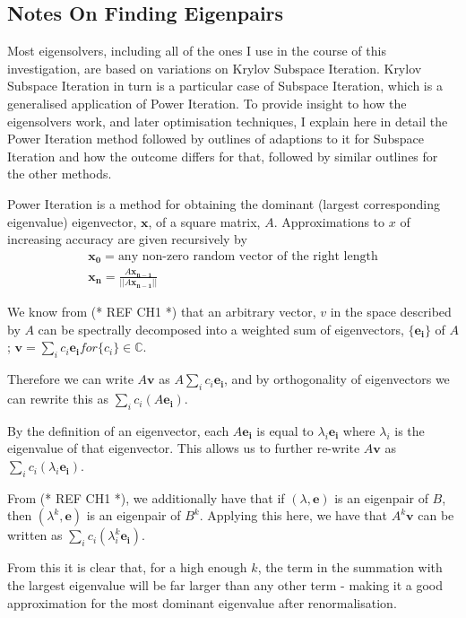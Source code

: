 \subsection{Notes On Finding Eigenpairs}
Most eigensolvers, including all of the ones I use in the course of this investigation, are based on variations on Krylov Subspace Iteration. Krylov Subspace Iteration in turn is a particular case of Subspace Iteration, which is a generalised application of Power Iteration. To provide insight to how the eigensolvers work, and later optimisation techniques, I explain here in detail the Power Iteration method followed by outlines of adaptions to it for Subspace Iteration and how the outcome differs for that, followed by similar outlines for the other methods. 


Power Iteration is a method for obtaining the dominant (largest corresponding eigenvalue) eigenvector, $\mathbf{x}$, of a square matrix, $A$. Approximations to $x$ of increasing accuracy are given recursively by
\begin{align*}
	\mathbf{x_0} = \text{any non-zero random vector of the right length}\\
	\mathbf{x_{n}} = \frac{A\mathbf{x_{n-1}}}{||A\mathbf{x_{n-1}}||}
\end{align*}

We know from (* REF CH1 *) that an arbitrary vector, $v$ in the space described by $A$ can be spectrally decomposed into a weighted sum of eigenvectors, $\{\mathbf{e_{i}}\}$ of $A$; $\mathbf{v} = \sum_{i}{c_{i}\mathbf{e_{i}}} for \{c_{i}\} \in \mathbb{C}$.

Therefore we can write $A\mathbf{v}$ as $A\sum_{i}{c_{i}\mathbf{e_{i}}}$, and by orthogonality of eigenvectors we can rewrite this as $\sum_{i}{c_{i}\left(A\mathbf{e_{i}}\right)}$. 

By the definition of an eigenvector, each $A\mathbf{e_i}$ is equal to $\lambda_{i}\mathbf{e_i}$ where $\lambda_i$ is the eigenvalue of that eigenvector. This allows us to further re-write $A\mathbf{v}$ as $\sum_{i}{c_{i}\left(\lambda_{i}\mathbf{e_{i}}\right)}$. 

From (* REF CH1 *), we additionally have that if $(\lambda,\mathbf{e})$ is an eigenpair of $B$, then $(\lambda^{k},\mathbf{e})$ is an eigenpair of $B^{k}$. Applying this here, we have that $A^{k}\mathbf{v}$ can be written as $\sum_{i}{c_{i}\left(\lambda_{i}^{k}\mathbf{e_{i}}\right)}$. 

From this it is clear that, for a high enough $k$, the term in the summation with the largest eigenvalue will be far larger than any other term - making it a good approximation for the most dominant eigenvalue after renormalisation. 

